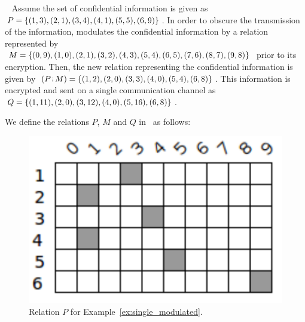 \begin{example}~
\label{ex:single_modulated}
	Assume the set of confidential information is given as $P = \{(1,3),(2,1),(3,4),(4,1),(5,5),(6,9)\}$. In order to obscure the transmission of the information, \AgentOne modulates the confidential information by a relation represented by $M = \{(0,9),(1,0),(2,1),(3,2),(4,3),(5,4),(6,5),(7,6),(8,7),(9,8)\}$ prior to its encryption. Then, the new relation representing the confidential information is given by $(\RAcompose{P}{M}) = \set{(1,2),(2,0),(3,3),(4,0),(5,4),(6,8)}$. This information is encrypted and sent on a single communication channel as $Q = \{(1,11),(2,0),(3,12),(4,0),(5,16),\\(6,8)\}$.  \newline 

	We define the relations $P$, $M$ and $Q$ in \relview\ as follows: \newline

	\begin{figure}[ht]
		\centering
		\includegraphics[scale=0.65]{Figures/PDF/Relview/P.pdf}
		\caption{Relation $P$ for Example~\ref{ex:single_modulated}.}
		\label{fig:single_modulated_p}
	\end{figure}
	

\end{example}

